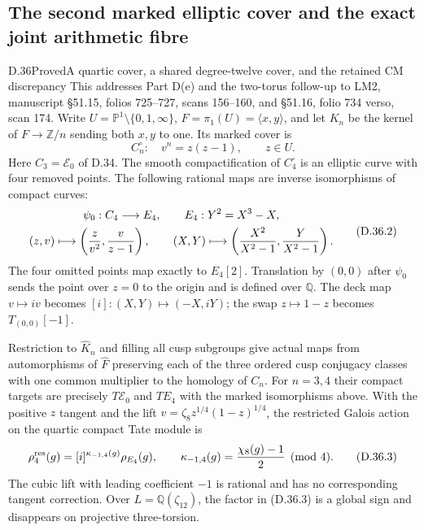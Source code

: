 \subsection{The second marked elliptic cover and the exact joint arithmetic fibre}

\begin{statement}{D.36}{Proved}{A quartic cover, a shared degree-twelve cover, and the retained CM discrepancy}
This addresses Part D(e) and the two-torus follow-up to LM2,
manuscript \S51.15, folios 725--727, scans 156--160, and
\S51.16, folio 734 verso, scan 174. Write
$U=\mathbb P^1\setminus\{0,1,\infty\}$,
$F=\pi_1(U)=\langle x,y\rangle$, and let $K_n$ be the kernel of
$F\to\mathbb Z/n$ sending both $x,y$ to one. Its marked cover is
\[
 C_n^\circ:\quad v^n=z(z-1),\qquad z\in U.             \tag{D.36.1}
\]
Here $C_3=\mathcal E_0$ of D.34. The smooth compactification of
$C_4^\circ$ is an elliptic curve with four removed points. The
following rational maps are inverse isomorphisms of compact curves:
\[
 \begin{gathered}
 \psi_0:C_4\longrightarrow E_4,\qquad E_4:Y^2=X^3-X,\\
 (z,v)\longmapsto
 \left({z\over v^2},{v\over z-1}\right),\qquad
 (X,Y)\longmapsto
 \left({X^2\over X^2-1},{Y\over X^2-1}\right).
 \end{gathered}                                      \tag{D.36.2}
\]
The four omitted points map exactly to $E_4[2]$.
Translation by $(0,0)$ after $\psi_0$ sends the point over $z=0$
to the origin and is defined over $\mathbb Q$.
The deck map $v\mapsto iv$ becomes $[i]:(X,Y)\mapsto(-X,iY)$;
the swap $z\mapsto1-z$ becomes $T_{(0,0)}[-1]$.

Restriction to $\widehat K_n$ and filling all cusp subgroups give
actual maps from automorphisms of $\widehat F$ preserving each of
the three ordered cusp conjugacy classes with one common multiplier
to the homology of $C_n$. For $n=3,4$ their compact targets are precisely
$T\mathcal E_0$ and $TE_4$ with the marked isomorphisms above.
With the positive $z$ tangent and the lift
$v=\zeta_8 z^{1/4}(1-z)^{1/4}$, the restricted Galois action on
the quartic compact Tate module is
\[
 \rho^{\rm res}_4(g)=[i]^{\kappa_{-1,4}(g)}\rho_{E_4}(g),
 \qquad\kappa_{-1,4}(g)={\chi_8(g)-1\over2}\pmod4.
                                                               \tag{D.36.3}
\]
The cubic lift with leading coefficient $-1$ is rational and has no
corresponding tangent correction. Over
$L=\mathbb Q(\zeta_{12})$, the factor in (D.36.3) is a global sign
and disappears on projective three-torsion.


\end{statement}
